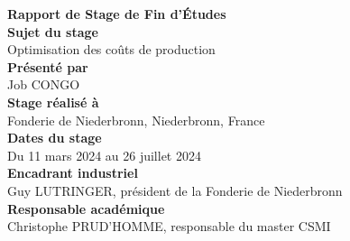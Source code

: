 \documentclass[12pt]{article}
\begin{document}
\begin{titlepage}
    \centering
    
    {\Huge \textbf{Rapport de Stage de Fin d'Études}} \\[1.5cm]
    {\large \textbf{Sujet du stage }} \\
    {\Large Optimisation des coûts de production} \\[2cm]
    
    {\Large \textbf{Présenté par }} \\
    {\Large Job CONGO} \\[1cm]
    
    {\large \textbf{Stage réalisé à }} \\
    {\large Fonderie de Niederbronn, Niederbronn, France} \\[0.5cm]

    {\large \textbf{Dates du stage }} \\
    {\large Du 11 mars 2024 au 26 juillet 2024} \\[1cm]

    {\large \textbf{Encadrant industriel }} \\
    {\large Guy LUTRINGER, président de la Fonderie de Niederbronn} \\[0.5cm]
    

    {\large \textbf{Responsable académique }} \\
    {\large Christophe PRUD’HOMME, responsable du master CSMI} \\[2cm]
    

\end{titlepage}
\end{document}
